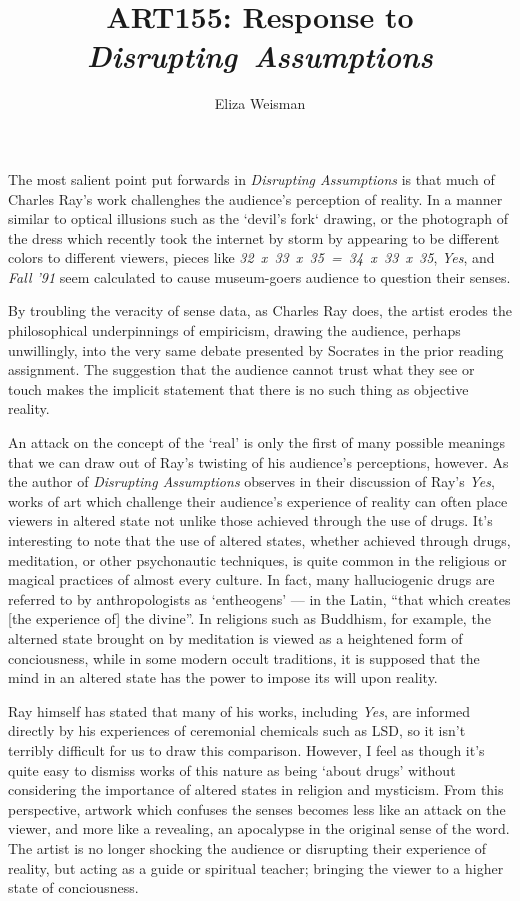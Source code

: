 \documentclass[a4paper,12pt]{article}
\title{\vspace{-4cm}ART155: Response to \textit{Disrupting~Assumptions}}
\author{Eliza Weisman}
\begin{document}
\maketitle
\doublespacing

The most salient point put forwards in \textit{Disrupting Assumptions} is that much of Charles Ray's work challenghes the audience's perception of reality. In a manner similar to optical illusions such as the `devil's fork` drawing, or the photograph of the dress which recently took the internet by storm by appearing to be different colors to different viewers, pieces like \textit{32~x~33~x~35~=~34~x~33~x~35}, \textit{Yes}, and \textit{Fall '91} seem calculated to cause museum-goers audience to question their senses.

By troubling the veracity of sense data, as Charles Ray does, the artist erodes the philosophical underpinnings of empiricism, drawing the audience, perhaps unwillingly, into the very same debate presented by Socrates in the prior reading assignment. The suggestion that the audience cannot trust what they see or touch makes the implicit statement that there is no such thing as objective reality.

An attack on the concept of the `real' is only the first of many possible meanings that we can draw out of Ray's twisting of his audience's perceptions, however. As the author of \textit{Disrupting Assumptions} observes in their discussion of Ray's \textit{Yes}, works of art which challenge their audience's experience of reality can often place viewers in altered state not unlike those achieved through the use of drugs. It's interesting to note that the use of altered states, whether achieved through drugs, meditation, or other psychonautic techniques, is quite common in the religious or magical practices of almost every culture. In fact, many halluciogenic drugs are referred to by anthropologists as `entheogens' --- in the Latin, ``that which creates [the experience of] the divine''. In religions such as Buddhism, for example, the alterned state brought on by meditation is viewed as a heightened form of conciousness, while in some modern occult traditions, it is supposed that the mind in an altered state has the power to impose its will upon reality.

Ray himself has stated that many of his works, including \textit{Yes}, are informed directly by his experiences of ceremonial chemicals such as LSD, so it isn't terribly difficult for us to draw this comparison. However, I feel as though it's quite easy to dismiss works of this nature as being `about drugs' without considering the importance of altered states in religion and mysticism. From this perspective, artwork which confuses the senses becomes less like an attack on the viewer, and more like a revealing, an apocalypse in the original sense of the word. The artist is no longer shocking the audience or disrupting their experience of reality, but acting as a guide or spiritual teacher; bringing the viewer to a higher state of conciousness.
\end{document}
